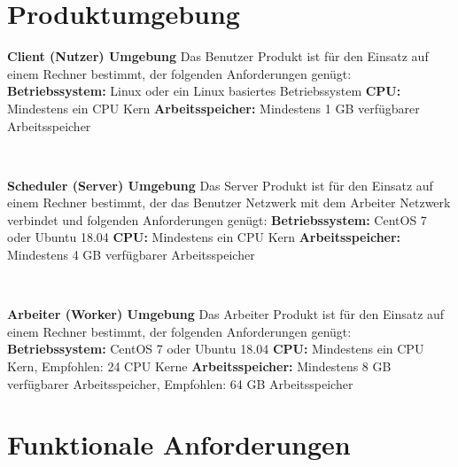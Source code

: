 \documentclass[a4paper,12pt]{article}
\begin{document}
\newpage
\section{Produktumgebung}

\begin{itemize}
\begin{minipage}[t]{\linewidth}
\item \textbf{Client (Nutzer) Umgebung}\newline
Das Benutzer Produkt ist für den Einsatz auf einem Rechner bestimmt, der folgenden Anforderungen genügt:
\subitem \textbf{Betriebssystem:} Linux oder ein Linux basiertes Betriebssystem
\subitem \textbf{CPU:} Mindestens ein CPU Kern
\subitem \textbf{Arbeitsspeicher:} Mindestens 1 GB verfügbarer Arbeitsspeicher
\end{minipage}
\\

\begin{minipage}[t]{\linewidth}
\item \textbf{Scheduler (Server) Umgebung}\newline
Das Server Produkt ist für den Einsatz auf einem Rechner bestimmt, der das Benutzer Netzwerk mit dem Arbeiter Netzwerk verbindet und folgenden Anforderungen genügt:
\subitem \textbf{Betriebssystem:} CentOS 7 oder Ubuntu 18.04
\subitem \textbf{CPU:} Mindestens ein CPU Kern
\subitem \textbf{Arbeitsspeicher:} Mindestens 4 GB verfügbarer Arbeitsspeicher
\end{minipage}
\\

\begin{minipage}[t]{\linewidth}
\item \textbf{Arbeiter (Worker) Umgebung}\newline
Das Arbeiter Produkt ist für den Einsatz auf einem Rechner bestimmt, der folgenden Anforderungen genügt:
\subitem \textbf{Betriebssystem:} CentOS 7 oder Ubuntu 18.04
\subitem \textbf{CPU:} Mindestens ein CPU Kern, Empfohlen: 24 CPU Kerne
\subitem \textbf{Arbeitsspeicher:} Mindestens 8 GB verfügbarer Arbeitsspeicher, Empfohlen: 64 GB Arbeitsspeicher
\end{minipage}
\end{itemize}
\newpage

\section{Funktionale Anforderungen}
\end{document}
